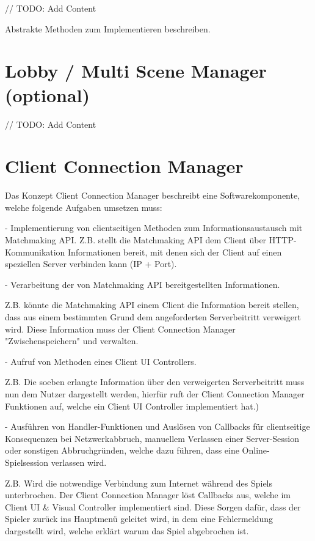 // TODO: Add Content

Abstrakte Methoden zum Implementieren beschreiben.

\section{Lobby / Multi Scene Manager (optional)}

// TODO: Add Content

\section{Client Connection Manager}

Das Konzept Client Connection Manager beschreibt eine Softwarekomponente, welche folgende Aufgaben umsetzen muss:

- Implementierung von clientseitigen Methoden zum Informationsaustausch mit Matchmaking API.
Z.B. stellt die Matchmaking API dem Client über HTTP-Kommunikation Informationen bereit, mit denen sich der Client auf einen speziellen Server verbinden kann (IP + Port). \cite{Wikipedia.2021d} \cite{Wikipedia.2021e}

- Verarbeitung der von Matchmaking API bereitgestellten Informationen. 

Z.B. könnte die Matchmaking API einem Client die Information bereit stellen, dass aus einem bestimmten Grund dem angeforderten Serverbeitritt verweigert wird. Diese Information muss der Client Connection Manager "Zwischenspeichern" und verwalten.

- Aufruf von Methoden eines Client UI Controllers.

Z.B. Die soeben erlangte Information über den verweigerten Serverbeitritt muss nun dem Nutzer dargestellt werden, hierfür ruft der Client Connection Manager Funktionen auf, welche ein Client UI Controller implementiert hat.)

- Ausführen von Handler-Funktionen und Auslösen von Callbacks für clientseitige Konsequenzen bei Netzwerkabbruch, manuellem Verlassen einer Server-Session oder sonstigen Abbruchgründen, welche dazu führen, dass eine Online-Spielsession verlassen wird.

Z.B. Wird die notwendige Verbindung zum Internet während des Spiels unterbrochen. Der Client Connection Manager löst Callbacks aus, welche im Client UI \& Visual Controller implementiert sind. Diese Sorgen dafür, dass der Spieler zurück ins Hauptmenü geleitet wird, in dem eine Fehlermeldung dargestellt wird, welche erklärt warum das Spiel abgebrochen ist.

